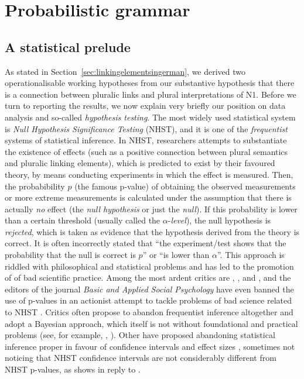 \section{Probabilistic grammar}
\label{sec:probabilisticgrammar}


\subsection{A statistical prelude}
\label{ssub:astatisticalprelude}

As stated in Section~\ref{sec:linkingelementsingerman}, we derived two operationalisable working hypotheses from our substantive hypothesis that there is a connection between pluralic links and plural interpretations of N1.
Before we turn to reporting the results, we now explain very briefly our position on data analysis and so-called \textit{hypothesis testing}.
The most widely used statistical system is \textit{Null Hypothesis Significance Testing} (NHST), and it is one of the \textit{frequentist} systems of statistical inference.
In NHST, researchers attempts to substantiate the existence of effects (such as a positive connection between plural semantics and pluralic linking elements), which is predicted to exist by their favoured theory, by means conducting experiments in which the effect is measured.
Then, the probabibility $p$ (the famous p-value) of obtaining the observed measurements or more extreme measurements is calculated under the assumption that there is actually \textit{no} effect (the \textit{null hypothesis} or just the \textit{null}).
If this probability is lower than a certain threshold (usually called the $\alpha$-\textit{level}), the null hypothesis is \textit{rejected}, which is taken as evidence that the hypothesis derived from the theory is correct.
It is often incorrectly stated that ``the experiment\slash test shows that the probability that the null is correct is $p$'' or ``is lower than $\alpha$''.
This approach is riddled with philosophical and statistical problems and has led to the promotion of of bad scientific practice.
Among the most ardent critics are \textcite{Gigerenzer2004}, \textcite{Colquhoun2014}, and \textcite{MunafoEa2017}, and the editors of the journal \textit{Basic and Applied Social Psychology} have even banned the use of p-values in an actionist attempt to tackle problems of bad science related to NHST \parencite{TrafimowMarks2016}.
Critics often propose to abandon frequentist inference altogether and adopt a Bayesian approach, which itself is not without foundational and practical problems (see, for example, \citealt{Mayo1996}, \citealt{Senn2011}).
Other have proposed abandoning statistical inference proper in favour of confidence intervals and effect sizes \parencite{Cumming2014}, sometimes not noticing that NHST confidence intervals are not considerably different from NHST p-values, as \textcite{Perezgonzalez2015b} shows in reply to \textcite{Cumming2014}.

